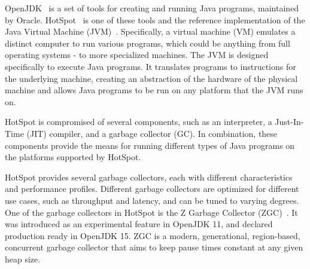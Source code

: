 
OpenJDK~\cite{openjdk} is a set of tools for creating and running Java programs, maintained by Oracle. HotSpot~\cite{hotspot} is one of these tools and the reference implementation of the Java Virtual Machine (JVM)~\cite{JVM}. Specifically, a virtual machine (VM) emulates a distinct computer to run various programs, which could be anything from full operating systems - to more specialized machines. The JVM is designed specifically to execute Java programs. It translates programs to instructions for the underlying machine, creating an abstraction of the hardware of the physical machine and allows Java programs to be run on any platform that the JVM runs on.

HotSpot is compromised of several components, such as an interpreter, a Just-In-Time (JIT) compiler, and a garbage collector (GC). In combination, these components provide the means for running different types of Java programs on the platforms supported by HotSpot.

HotSpot provides several garbage collectors, each with different characteristics and performance profiles. Different garbage collectors are optimized for different use cases, such as throughput and latency, and can be tuned to varying degrees. One of the garbage collectors in HotSpot is the Z Garbage Collector (ZGC)~\cite{zgc}. It was introduced as an experimental feature in OpenJDK 11, and declared production ready in OpenJDK 15. ZGC is a modern, generational, region-based, concurrent garbage collector that aims to keep pause times constant at any given heap size.


